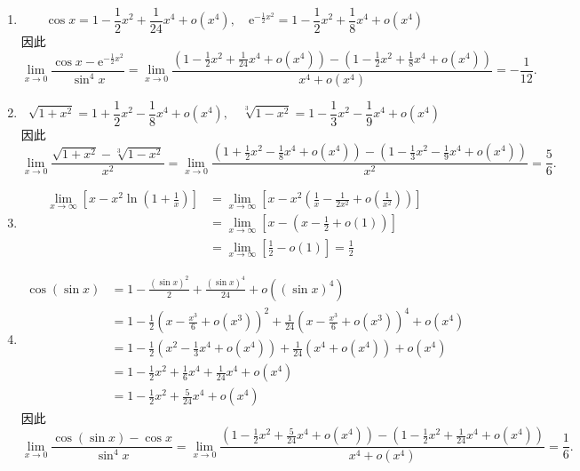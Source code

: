 \begin{solution}
    \begin{enumerate}
        \item $$\cos x = 1 - \frac{1}{2}x^2 + \frac{1}{24}x^4 + o(x^4), \quad \mathrm{e}^{-\frac{1}{2}x^2} = 1 - \frac{1}{2}x^2 + \frac{1}{8}x^4 + o(x^4)$$
              因此$$\lim_{x \to 0} \frac{\cos x - \mathrm{e}^{-\frac{1}{2}x^2}}{\sin^4 x} = \lim_{x \to 0} \frac{\left(1 - \frac{1}{2}x^2 + \frac{1}{24}x^4 + o(x^4)\right) - \left(1 - \frac{1}{2}x^2 + \frac{1}{8}x^4 + o(x^4)\right)}{x^4 + o(x^4)} = -\frac{1}{12}.$$
        \item $$\sqrt{1 + x^2} = 1 + \frac{1}{2}x^2 - \frac{1}{8}x^4 + o(x^4), \quad \sqrt[3]{1 - x^2} = 1 - \frac{1}{3}x^2 - \frac{1}{9}x^4 + o(x^4)$$
              因此$$\lim_{x \to 0} \frac{\sqrt{1 + x^2} - \sqrt[3]{1 - x^2}}{x^2} = \lim_{x \to 0} \frac{\left(1 + \frac{1}{2}x^2 - \frac{1}{8}x^4 + o(x^4)\right) - \left(1 - \frac{1}{3}x^2 - \frac{1}{9}x^4 + o(x^4)\right)}{x^2} = \frac{5}{6}.$$
        \item \begin{align*}
                  \lim_{x \to \infty} \left[x - x^2 \ln \left(1 + \frac{1}{x}\right)\right] & = \lim_{x \to \infty} \left[x - x^2 \left(\frac{1}{x} - \frac{1}{2x^2} + o\left(\frac{1}{x^2}\right)\right)\right] \\
                                                                                            & = \lim_{x \to \infty} \left[x - \left(x - \frac{1}{2} + o(1)\right)\right]                                         \\
                                                                                            & = \lim_{x \to \infty} \left[\frac{1}{2} - o(1)\right] = \frac{1}{2}
              \end{align*}
        \item \begin{align*}
                  \cos(\sin x) & = 1 - \frac{(\sin x)^2}{2} + \frac{(\sin x)^4}{24} + o((\sin x)^4)                                                          \\
                               & = 1 - \frac{1}{2}\left(x - \frac{x^3}{6} + o(x^3)\right)^2 + \frac{1}{24}\left(x - \frac{x^3}{6} + o(x^3)\right)^4 + o(x^4) \\
                               & = 1 - \frac{1}{2}\left(x^2 - \frac{1}{3}x^4 + o(x^4)\right) + \frac{1}{24}\left(x^4 + o(x^4)\right) + o(x^4)                \\
                               & = 1 - \frac{1}{2}x^2 + \frac{1}{6}x^4 + \frac{1}{24}x^4 + o(x^4)                                                            \\
                               & = 1 - \frac{1}{2}x^2 + \frac{5}{24}x^4 + o(x^4)
              \end{align*}
              因此$$\lim_{x \to 0} \frac{\cos(\sin x) - \cos x}{\sin^4 x} = \lim_{x \to 0} \frac{\left(1 - \frac{1}{2}x^2 + \frac{5}{24}x^4 + o(x^4)\right) - \left(1 - \frac{1}{2}x^2 + \frac{1}{24}x^4 + o(x^4)\right)}{x^4 + o(x^4)} = \frac{1}{6}.$$

    \end{enumerate}
\end{solution}

